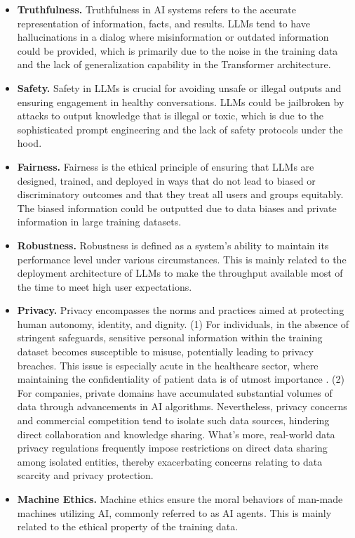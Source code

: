 \documentclass[lang=en]{sjtuarticle}
\begin{document}
\begin{itemize}
    \item \textbf{Truthfulness.} Truthfulness in AI systems refers to the accurate representation of information, facts, and
    results. LLMs tend to have hallucinations in a dialog where misinformation or outdated information could be provided, which is primarily due to the noise in the training data and the lack of generalization capability in the Transformer architecture.
    \item \textbf{Safety.} Safety in LLMs is crucial for avoiding unsafe or illegal outputs and ensuring engagement in healthy
    conversations. LLMs could be jailbroken by attacks to output knowledge that is illegal or toxic, which is due to the sophisticated prompt engineering and the lack of safety protocols under the hood.
    \item \textbf{Fairness.} Fairness is the ethical principle of ensuring that LLMs are designed, trained, and deployed in ways
    that do not lead to biased or discriminatory outcomes and that they treat all users and groups equitably. The biased information could be outputted due to data biases and private
    information in large training datasets.
    \item \textbf{Robustness.} Robustness is defined as a system's ability to maintain its performance level under various
    circumstances. This is mainly related to the deployment architecture of LLMs to make the throughput available most of the time to meet high user expectations.
    \item \textbf{Privacy.} Privacy encompasses the norms and practices aimed at protecting human autonomy, identity, and
    dignity. (1) For individuals, in the absence of stringent safeguards, sensitive personal information within the
    training dataset becomes susceptible to misuse, potentially
    leading to privacy breaches. This issue is especially acute in the healthcare sector, where maintaining the
    confidentiality of patient data is of utmost importance \cite{chen2023federated}. (2) For companies, private domains have accumulated substantial volumes of data through
    advancements in AI algorithms. Nevertheless, privacy concerns and commercial competition tend to isolate such data
    sources, hindering direct collaboration and knowledge sharing. What's more, real-world data privacy regulations
    frequently impose restrictions on direct data sharing among isolated entities, thereby exacerbating concerns relating to
    data scarcity and privacy protection.
    \item \textbf{Machine Ethics.} Machine ethics ensure the moral behaviors of man-made machines utilizing AI, commonly
    referred to as AI agents. This is mainly related to the ethical property of the training data.
\end{itemize}
\end{document}
